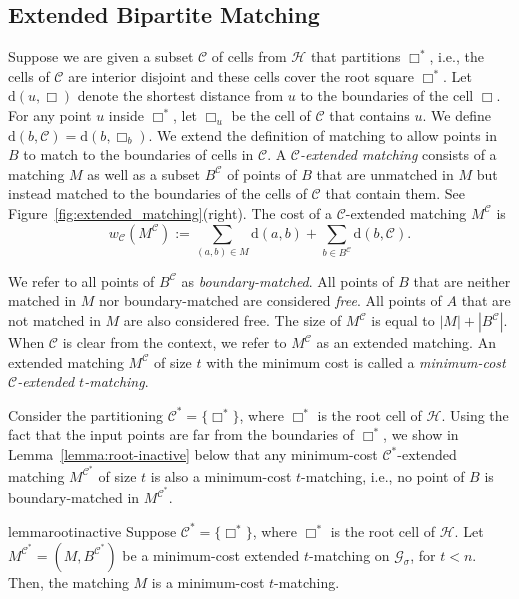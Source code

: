 \documentclass[11pt,onecolumn]{article}
\def\mcC{{\mathcal{C}}}
\def\mcG{{\mathcal{G}}}
\def\mcH{{\mathcal{H}}}
\newcommand{\cell}{\Box}
\newcommand{\distance}[2]{\mathrm{d}(#1, #2)}
\begin{document}
\subsection{Extended Bipartite Matching}\label{sec:primal}
Suppose we are given a subset $\mcC$ of cells from $\mcH$ that partitions $\cell^*$, i.e., the cells of $\mcC$ are interior disjoint and these cells cover the root square $\cell^*$. Let $\distance{u}{\cell}$ denote the shortest distance from $u$ to the boundaries of the cell $\cell$. For any point $u$ inside $\cell^*$, let $\cell_u$ be the cell of $\mcC$ that contains $u$. We define $\distance{b}{\mcC} = \distance{b}{\cell_b}$. We extend the definition of matching to allow points in $B$ to match to the boundaries of cells in $\mcC$. A \emph{$\mcC$-extended matching} consists of a matching $M$ as well as a subset $B^\mcC$ of points of $B$ that are unmatched in $M$ but instead matched to the boundaries of the cells of $\mcC$ that contain them. See Figure~\ref{fig:extended_matching}(right). The cost of a $\mcC$-extended matching $M^\mcC$ is
\begin{equation}
    w_\mcC(M^\mcC) := \sum_{(a,b)\in M} \distance{a}{b} + \sum_{b \in B^{\mcC}} \distance{b}{\mcC}.
\end{equation}

We refer to all points of $B^{\mcC}$ as \emph{boundary-matched}. All points of $B$ that are neither matched in $M$ nor boundary-matched are considered \emph{free}. All points of $A$ that are not matched in $M$ are also considered free. The size of $M^{\mcC}$ is equal to $|M|+|B^{\mcC}|$. When $\mcC$ is clear from the context, we refer to $M^{\mcC}$ as an extended matching. An extended matching $M^{\mcC}$ of size $t$ with the minimum cost is called a \emph{minimum-cost $\mcC$-extended $t$-matching}.





Consider the partitioning $\mcC^*=\{\cell^*\}$, where $\cell^*$ is the root cell of $\mcH$. Using the fact that the input points are far from the boundaries of $\cell^*$, we show in Lemma~\ref{lemma:root-inactive} below that any minimum-cost $\mcC^*$-extended matching $M^{\mcC^*}$ of size $t$ is also a minimum-cost $t$-matching, i.e., no point of $B$ is boundary-matched in $M^{\mcC^*}$. 
\begin{restatable}{lemma}{rootinactive}\label{lemma:root-inactive}
    Suppose $\mcC^*=\{\cell^*\}$, where $\cell^*$ is the root cell of $\mcH$. Let $M^{\mcC^*}=(M, B^{\mcC^*})$ be a minimum-cost extended $t$-matching on $\mcG_\sigma$, for $t<n$. Then, the matching $M$ is a minimum-cost $t$-matching.
\end{restatable}
\end{document}
